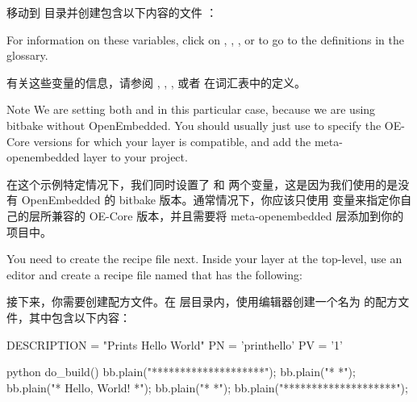 \begin{enumerate}
\medskip
移动到  目录并创建包含以下内容的文件 ：

\medskip
{}

\medskip
For information on these variables, click on , , ,  or  to go to the definitions in the glossary.

\medskip
有关这些变量的信息，请参阅 , , ,  或者  在词汇表中的定义。

\medskip
\begin{noteblock}{Note}
We are setting both  and  in this particular case, because we are using bitbake without OpenEmbedded. You should usually just use  to specify the OE-Core versions for which your layer is compatible, and add the meta-openembedded layer to your project.

\medskip
在这个示例特定情况下，我们同时设置了  和  两个变量，这是因为我们使用的是没有 OpenEmbedded 的 bitbake 版本。通常情况下，你应该只使用  变量来指定你自己的层所兼容的 OE-Core 版本，并且需要将 meta-openembedded 层添加到你的项目中。
\end{noteblock}

\medskip
You need to create the recipe file next. Inside your layer at the top-level, use an editor and create a recipe file named  that has the following:

\medskip
接下来，你需要创建配方文件。在  层目录内，使用编辑器创建一个名为  的配方文件，其中包含以下内容：

\medskip
\begin{pyglist}
DESCRIPTION = "Prints Hello World"
PN = 'printhello'
PV = '1'

python do_build() {
   bb.plain("********************");
   bb.plain("*                  *");
   bb.plain("*  Hello, World!   *");
   bb.plain("*                  *");
   bb.plain("********************");
}
\end{pyglist}


\end{enumerate}
